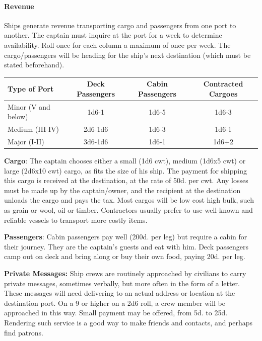 \documentclass{book}
\begin{document}
\newpage

\paragraph{Revenue}\label{revenue}

Ships generate revenue transporting cargo and passengers from one port
to another. The captain must inquire at the port for a week to determine
availability. Roll once for each column a maximum of once per week. The
cargo/passengers will be heading for the ship's next destination (which
must be stated beforehand).

\begin{table}[h]
	\centering
	\begin{tabular}{lccc}
		\toprule
		Type of Port & Deck Passengers 
		& Cabin Passengers & Contracted Cargoes \\
		\midrule
			Minor (V and below) & 1d6-1 & 1d6-5 & 1d6-3 \\
			Medium (III-IV) & 2d6-1d6 & 1d6-3 & 1d6-1 \\
			Major (I-II) & 3d6-1d6 & 1d6-1 & 1d6+2 \\
		\bottomrule
	\end{tabular}
\end{table}

\textbf{Cargo}: The captain chooses either a small (1d6 cwt), medium
(1d6x5 cwt) or large (2d6x10 cwt) cargo, as fits the size of his ship.
The payment for shipping this cargo is received at the destination, at
the rate of 50d. per cwt. Any losses must be made up by the
captain/owner, and the recipient at the destination unloads the cargo
and pays the tax. Most cargos will be low cost high bulk, such as grain
or wool, oil or timber. Contractors usually prefer to use well-known and
reliable vessels to transport more costly items.

\textbf{Passengers}: Cabin passengers pay well (200d. per leg) but
require a cabin for their journey. They are the captain's guests and eat
with him. Deck passengers camp out on deck and bring along or buy their
own food, paying 20d. per leg.

\textbf{Private Messages:} Ship crews are routinely approached by
civilians to carry private messages, sometimes verbally, but more often
in the form of a letter. These messages will need delivering to an
actual address or location at the destination port. On a 9 or higher on
a 2d6 roll, a crew member will be approached in this way. Small payment
may be offered, from 5d. to 25d. Rendering such service is a good way to
make friends and contacts, and perhaps find patrons.
\end{document}
